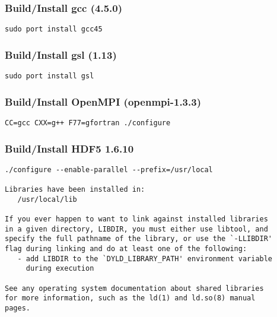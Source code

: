 \subsubsection{Build/Install gcc (4.5.0)}
\begin{footnotesize}
\begin{verbatim}
sudo port install gcc45
\end{verbatim}
\end{footnotesize}

\subsubsection{Build/Install gsl (1.13)}
\begin{footnotesize}
\begin{verbatim}
sudo port install gsl
\end{verbatim}
\end{footnotesize}

\subsubsection{Build/Install OpenMPI (openmpi-1.3.3)}
\begin{footnotesize}
\begin{verbatim}
CC=gcc CXX=g++ F77=gfortran ./configure
\end{verbatim}
\end{footnotesize}

\subsubsection{Build/Install HDF5 1.6.10}
\begin{footnotesize}
\begin{verbatim}
./configure --enable-parallel --prefix=/usr/local

Libraries have been installed in:
   /usr/local/lib

If you ever happen to want to link against installed libraries
in a given directory, LIBDIR, you must either use libtool, and
specify the full pathname of the library, or use the `-LLIBDIR'
flag during linking and do at least one of the following:
   - add LIBDIR to the `DYLD_LIBRARY_PATH' environment variable
     during execution

See any operating system documentation about shared libraries 
for more information, such as the ld(1) and ld.so(8) manual 
pages.
\end{verbatim}
\end{footnotesize}

